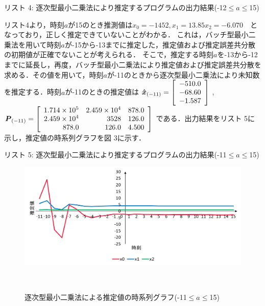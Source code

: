 \documentclass[a4paper]{jarticle}
\begin{document}
\begin{center}
リスト 4: 逐次型最小二乗法により推定するプログラムの出力結果(-12$\le a \le $15)
\begin{small}
\vspace{1mm}
\end{small}
\end{center}

リスト4より，時刻$a$が15のとき推測値は\(x_{0}=-1452, x_1 = 13.85 x_2 = -6.070\)　となっており，正しく推定できていないことがわかる．
これは，バッチ型最小二乗法を用いて時刻$a$が-15から-13までに推定した，推定値および推定誤差共分散の初期値が正確でないことが考えられる．
そこで，推定する時刻$a$を-13から-12までに延長し，再度，バッチ型最小二乗法により推定値および推定誤差共分散を求める．その値を用いて，時刻$a$が-11のときから逐次型最小二乗法により未知数を推定する．時刻$a$が-11のときの推定値は
\( \mbox{\boldmath $\hat{x}$}_{(-11)}= 
\left[
\begin{array}{r}
{-510.0} \\ {-68.60} \\{-1.587} \\ 
\end{array}
\right]
\) , 
\(
 \mbox{\boldmath $P$}_{(-11)}= 
\left[
\begin{array}{rrr}
1.714\times{10}^{5} & 2.459\times{10}^{4} & 878.0\\ 
2.459\times{10}^{4} & 3528 & 126.0\\
878.0 & 126.0 & 4.500 \\ 
\end{array}
\right]
\)
である．出力結果をリスト 5に示し，推定値の時系列グラフを図 3に示す．

\newpage
\begin{center}
リスト 5: 逐次型最小二乗法により推定するプログラムの出力結果(-11$\le a \le $15)
\begin{small}
\vspace{1mm}
\end{small}
\end{center}

\begin{figure}[!h]
  \centering
  \includegraphics[width=16cm]{Sequen.png}
  \caption{逐次型最小二乗法による推定値の時系列グラフ(-11$\le a \le $15)}
　\label{graph}
\end{figure}
\end{document}
